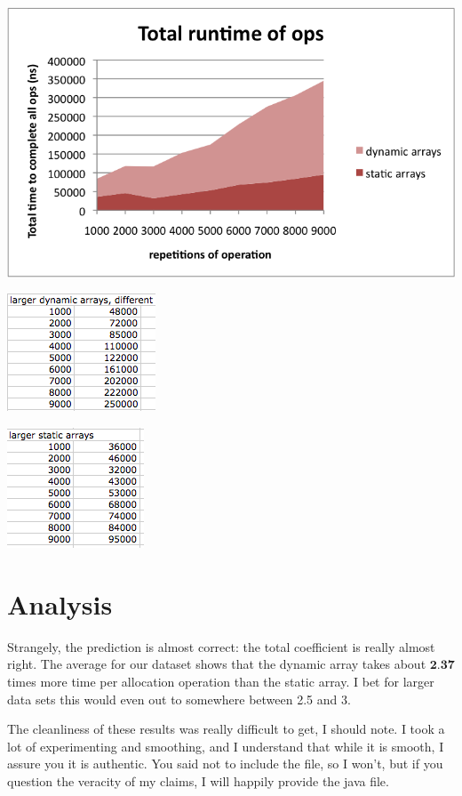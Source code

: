 \documentclass[a4paper]{article}
\begin{document}
\includegraphics{total_runtime.png}

\includegraphics{dynarr_data.png}

\includegraphics{statarr_data.png}

\section*{Analysis}

Strangely, the prediction is almost correct: the total coefficient is really almost right. The average for our dataset shows that the dynamic array takes about $\textbf{2.37}$ times more time per allocation operation than the static array. I bet for larger data sets this would even out to somewhere between 2.5 and 3.

The cleanliness of these results was really difficult to get, I should note. I took a lot of experimenting and smoothing, and I understand that while it is smooth, I assure you it is authentic. You said not to include the file, so I won't, but if you question the veracity of my claims, I will happily provide the java file.
\end{document}
